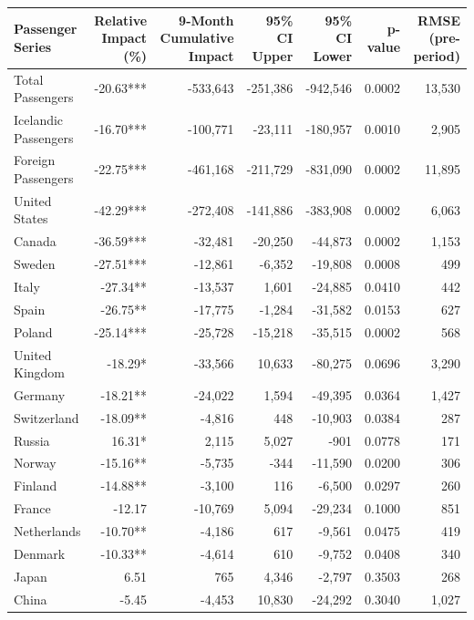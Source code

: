 \begin{tabular}{lrrrrrr}
\toprule
Passenger Series & Relative Impact (\%) & 9-Month Cumulative Impact & 95\% CI Upper & 95\% CI Lower & p-value & RMSE (pre-period) \\
\midrule
Total Passengers & -20.63*** & -533,643 & -251,386 & -942,546 & 0.0002 & 13,530 \\
\midrule
Icelandic Passengers & -16.70*** & -100,771 & -23,111 & -180,957 & 0.0010 & 2,905 \\
Foreign Passengers & -22.75*** & -461,168 & -211,729 & -831,090 & 0.0002 & 11,895 \\
\midrule
United States & -42.29*** & -272,408 & -141,886 & -383,908 & 0.0002 & 6,063 \\
Canada & -36.59*** & -32,481 & -20,250 & -44,873 & 0.0002 & 1,153 \\
Sweden & -27.51*** & -12,861 & -6,352 & -19,808 & 0.0008 & 499 \\
Italy & -27.34** & -13,537 & 1,601 & -24,885 & 0.0410 & 442 \\
Spain & -26.75** & -17,775 & -1,284 & -31,582 & 0.0153 & 627 \\
Poland & -25.14*** & -25,728 & -15,218 & -35,515 & 0.0002 & 568 \\
United Kingdom & -18.29* & -33,566 & 10,633 & -80,275 & 0.0696 & 3,290 \\
Germany & -18.21** & -24,022 & 1,594 & -49,395 & 0.0364 & 1,427 \\
Switzerland & -18.09** & -4,816 & 448 & -10,903 & 0.0384 & 287 \\
Russia & 16.31* & 2,115 & 5,027 & -901 & 0.0778 & 171 \\
Norway & -15.16** & -5,735 & -344 & -11,590 & 0.0200 & 306 \\
Finland & -14.88** & -3,100 & 116 & -6,500 & 0.0297 & 260 \\
France & -12.17 & -10,769 & 5,094 & -29,234 & 0.1000 & 851 \\
Netherlands & -10.70** & -4,186 & 617 & -9,561 & 0.0475 & 419 \\
Denmark & -10.33** & -4,614 & 610 & -9,752 & 0.0408 & 340 \\
Japan & 6.51 & 765 & 4,346 & -2,797 & 0.3503 & 268 \\
China & -5.45 & -4,453 & 10,830 & -24,292 & 0.3040 & 1,027 \\
\bottomrule
\end{tabular}
